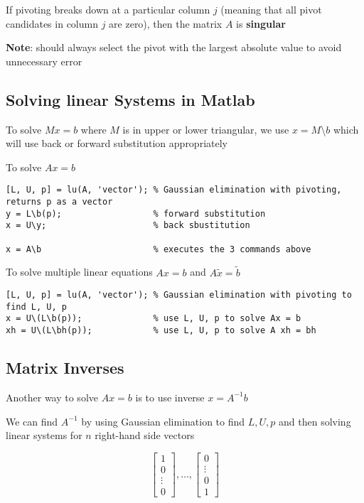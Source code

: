\documentclass{article}
\begin{document}
If pivoting breaks down at a particular column $j$ (meaning that all pivot candidates in column $j$ are zero), then the matrix $A$ is \textbf{singular}

\textbf{Note}: should always select the pivot with the largest absolute value to avoid unnecessary error

\subsection{Solving linear Systems in Matlab}

To solve $Mx = b$ where $M$ is in upper or lower triangular, we use $x=M$\textbackslash$b$ which will use back or forward substitution appropriately

To solve $Ax = b$
\begin{lstlisting}
[L, U, p] = lu(A, 'vector'); % Gaussian elimination with pivoting, returns p as a vector
y = L\b(p);                  % forward substitution
x = U\y;                     % back sbustitution

x = A\b                      % executes the 3 commands above
\end{lstlisting}

To solve multiple linear equations $Ax = b$ and $A\tilde{x} = \tilde{b}$
\begin{lstlisting}
[L, U, p] = lu(A, 'vector'); % Gaussian elimination with pivoting to find L, U, p
x = U\(L\b(p));              % use L, U, p to solve Ax = b
xh = U\(L\bh(p));            % use L, U, p to solve A xh = bh
\end{lstlisting}

\subsection{Matrix Inverses}

Another way to solve $Ax = b$ is to use inverse $x = A^{-1}b$

We can find $A^{-1}$ by using Gaussian elimination to find $L, U, p$ and then solving linear systems for $n$ right-hand side vectors

\[ \begin{bmatrix} 1 \\ 0 \\ \vdots \\ 0 \end{bmatrix}, \ldots, \begin{bmatrix} 0 \\ \vdots \\ 0 \\ 1 \end{bmatrix}\]
\end{document}
